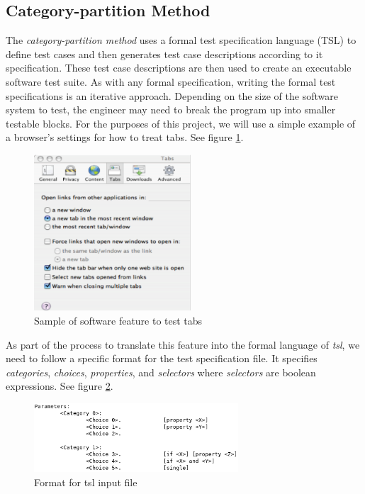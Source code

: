 \documentclass[a4full,12pt]{article}
\begin{document}
\subsection{Category-partition Method}
The \emph{category-partition method} uses a formal test specification language (TSL) to define
test cases and then generates test case descriptions according to it specification. These test case descriptions are then used to
  create an executable software test suite. As with any formal specification, writing the formal test 
  specifications is an iterative approach. Depending on the size of the software system to test, the 
  engineer may need to break the program up into smaller testable blocks. For 
  the purposes of this project, we will use a simple example of a browser's 
  settings for how to treat tabs. See figure \ref{fig:tabs_example}.
\begin{figure}[htb]
\centering
\includegraphics[width=2.3in,keepaspectratio]{images/tabs_example.png}
\caption{Sample of software feature to test tabs}
\label{fig:tabs_example}
\end{figure}

As part of the process to translate this feature into the formal language of \emph{tsl},
  we need to follow a specific format for the test specification file. It specifies
  \emph{categories}, \emph{choices}, \emph{properties}, and \emph{selectors} where 
  \emph{selectors} are boolean expressions. See figure \ref{fig:tsl_format}.
\begin{figure}[htb]
\centering
\includegraphics[width=3in,keepaspectratio]{images/tsl_format.png}
\caption{Format for tsl input file}
\label{fig:tsl_format}
\end{figure}
\end{document}
